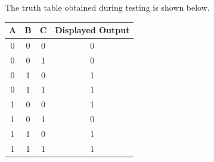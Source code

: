 \documentclass[12pt,a4paper]{article}
\begin{document}
The truth table obtained during testing is shown below.

\begin{center}
\begin{tabular}{|c|c|c|c|}
\hline
\textbf{A} & \textbf{B} & \textbf{C} & \textbf{Displayed Output} \\
\hline
0 & 0 & 0 & 0 \\
\hline
0 & 0 & 1 & 0 \\
\hline
0 & 1 & 0 & 1 \\
\hline
0 & 1 & 1 & 1 \\
\hline
1 & 0 & 0 & 1 \\
\hline
1 & 0 & 1 & 0 \\
\hline
1 & 1 & 0 & 1 \\
\hline
1 & 1 & 1 & 1 \\
\hline
\end{tabular}
\end{center}
\end{document}
